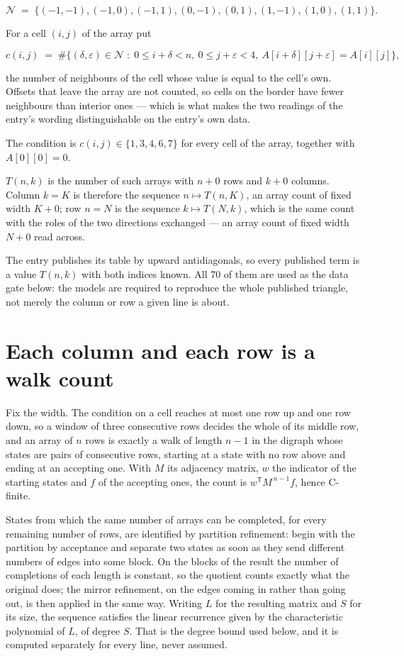 \documentclass[11pt]{article}
\theoremstyle{definition}
\begin{document}
\[\mathcal{N} \;=\; \{(-1,-1), (-1,0), (-1,1), (0,-1), (0,1), (1,-1), (1,0), (1,1)\}.\]

For a cell $(i,j)$ of the array put

\[c(i,j) \;=\; \#\bigl\{(\delta,\varepsilon)\in\mathcal{N} \;:\; 0\le i+\delta<n,\ 0\le j+\varepsilon<4,\ A[i+\delta][j+\varepsilon] = A[i][j]\bigr\},\]

the number of neighbours of the cell whose value is equal to the cell's own. Offsets that leave the array are not counted, so cells on the border have fewer neighbours than interior ones --- which is what makes the two readings of the entry's wording distinguishable on the entry's own data.

The condition is $c(i,j) \in \{1, 3, 4, 6, 7\}$ for every cell of the array, together with $A[0][0]=0$.

$T(n,k)$ is the number of such arrays with $n + 0$ rows and $k + 0$ columns. Column $k = K$ is therefore the sequence $n \mapsto T(n,K)$, an array count of fixed width $K + 0$; row $n = N$ is the sequence $k \mapsto T(N,k)$, which is the same count with the roles of the two directions exchanged --- an array count of fixed width $N + 0$ read across.

The entry publishes its table by upward antidiagonals, so every published term is a value $T(n,k)$ with both indices known. All 70 of them are used as the data gate below: the models are required to reproduce the whole published triangle, not merely the column or row a given line is about.

\section{Each column and each row is a walk count}

Fix the width. The condition on a cell reaches at most one row up and one row down, so a window of three consecutive rows decides the whole of its middle row, and an array of $n$ rows is exactly a walk of length $n-1$ in the digraph whose states are pairs of consecutive rows, starting at a state with no row above and ending at an accepting one. With $M$ its adjacency matrix, $w$ the indicator of the starting states and $f$ of the accepting ones, the count is $w^{\mathsf T}M^{\,n-1}f$, hence C-finite.

States from which the same number of arrays can be completed, for every remaining number of rows, are identified by partition refinement: begin with the partition by acceptance and separate two states as soon as they send different numbers of edges into some block. On the blocks of the result the number of completions of each length is constant, so the quotient counts exactly what the original does; the mirror refinement, on the edges coming in rather than going out, is then applied in the same way. Writing $L$ for the resulting matrix and $S$ for its size, the sequence satisfies the linear recurrence given by the characteristic polynomial of $L$, of degree $S$. That is the degree bound used below, and it is computed separately for every line, never assumed.
\end{document}
